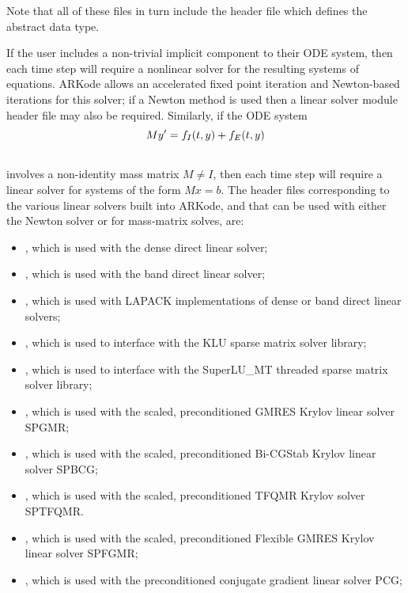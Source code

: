 \documentclass[letterpaper,10pt,english]{sphinxmanual}
\begin{document}
Note that all of these files in turn include the header file
 which defines the abstract  data
type.

If the user includes a non-trivial implicit component to their
ODE system, then each time step will require a nonlinear solver for
the resulting systems of equations.  ARKode allows an accelerated
fixed point iteration and Newton-based iterations for this solver; if
a Newton method is used then a linear solver module header file may
also be required.  Similarly, if the ODE system
\begin{gather}
\begin{split}M y' = f_I(t,y) + f_E(t,y)\end{split}\notag\\\begin{split}\end{split}\notag
\end{gather}
involves a non-identity mass matrix $M\ne I$, then each time
step will require a linear solver for systems of the form
$Mx=b$.  The header files corresponding to the various linear
solvers built into ARKode, and that can be used with either the Newton
solver or for mass-matrix solves, are:
\begin{itemize}
\item {} 
, which is used with the dense direct linear solver;

\item {} 
, which is used with the band direct linear solver;

\item {} 
, which is used with LAPACK implementations of dense
or band direct linear solvers;

\item {} 
, which is used to interface with the KLU sparse
matrix solver library;

\item {} 
, which is used to interface with the
SuperLU\_MT threaded sparse matrix solver library;

\item {} 
, which is used with the scaled, preconditioned GMRES
Krylov linear solver SPGMR;

\item {} 
, which is used with the scaled, preconditioned
Bi-CGStab Krylov linear solver SPBCG;

\item {} 
, which is used with the scaled, preconditioned
TFQMR Krylov solver SPTFQMR.

\item {} 
, which is used with the scaled, preconditioned
Flexible GMRES Krylov linear solver SPFGMR;

\item {} 
, which is used with the preconditioned
conjugate gradient linear solver PCG;

\end{itemize}
\end{document}
